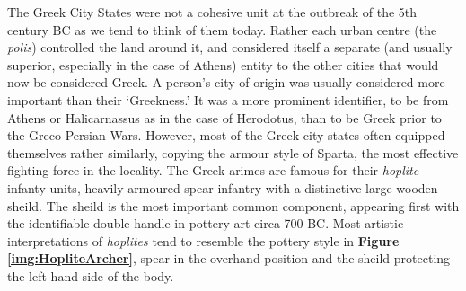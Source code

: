 \documentclass[twoside, a4paper, 12pt]{article}
\begin{document}
The Greek City States were not a cohesive unit at the outbreak of the 5th century
BC as we tend to think of them today. Rather each urban centre (the
\emph{polis}) controlled
the land around it, and considered itself a separate (and usually superior, especially
in the case of Athens)
entity to the other cities that would now be considered Greek. A person's city of
origin was usually considered more important than their `Greekness.' It was
a more prominent identifier, to be from Athens or Halicarnassus
as in the case of Herodotus, than to be Greek prior to the
Greco-Persian Wars. However, most of the Greek city states often equipped
themselves rather similarly, copying the armour style of Sparta, the most
effective fighting force in the locality.
The Greek arimes are famous for their \emph{hoplite} infanty units, heavily
armoured spear infantry with a distinctive large wooden sheild. The sheild is
the most important common component, appearing first with the
identifiable double handle in pottery art
circa 700 BC.\footnotemark
Most artistic interpretations of \emph{hoplites} tend to resemble the pottery
style in \textbf{Figure \ref{img:HopliteArcher}}, spear in the overhand
position and the sheild protecting the left-hand side of the body.
\par\vspace{1em}
\end{document}
